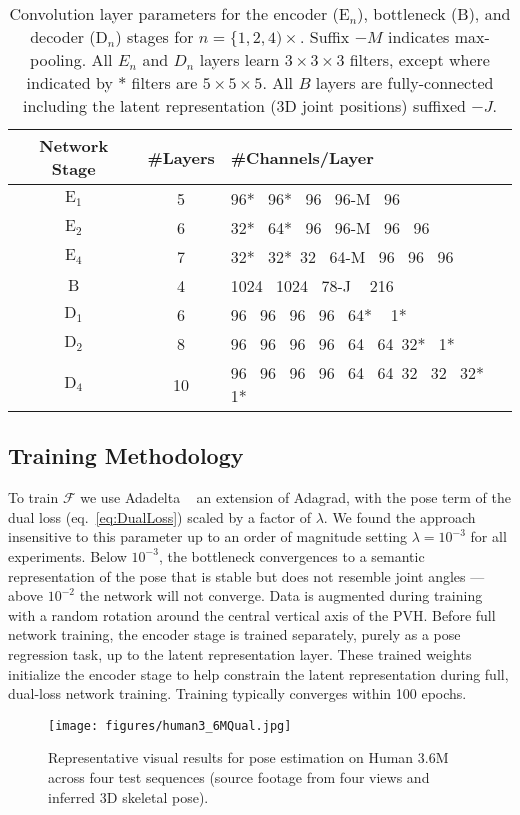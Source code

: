 \documentclass[runningheads]{llncs}
\begin{document}
\begin{table}[t!]
\centering
{
\small
\begin{tabular}{ccl}
\hline
Network Stage   &  \#Layers & \#Channels/Layer \\
\hline
$\mathrm{E}_1$ & 5 & 96*~ 96*~  96~ 96-M~ 96\\
$\mathrm{E}_2$ & 6 & 32*~ 64*~ 96~ 96-M~ 96~ 96\\
$\mathrm{E}_4$ & 7 & 32*~ 32*~32~ 64-M~ 96~ 96~ 96 \\
\hline
$\mathrm{B}$ & 4 & 1024~ 1024~ 78-J ~ 216 \\
\hline
$\mathrm{D}_1$ & 6 & 96~ 96~ 96~ 96~ 64* ~ 1*\\
$\mathrm{D}_2$ & 8 & 96~ 96~ 96~ 96~ 64~ 64~32*~ 1*\\
$\mathrm{D}_4$ & 10 & 96~ 96~ 96~ 96~ 64~ 64~32~ 32~ 32*~ 1*\\
\hline
\end{tabular}
}
\caption{Convolution layer parameters for the encoder ($\mathrm{E}_n$), bottleneck ($\mathrm{B}$), and decoder ($\mathrm{D}_n$) stages for $n=\{1,2,4)\times$.  Suffix $-M$ indicates max-pooling. All $E_n$ and $D_n$ layers learn $3 \times 3 \times 3$ filters, except where indicated by $*$ filters are $5 \times 5 \times 5$. All $B$ layers are fully-connected including the latent representation (3D joint positions) suffixed $-J$.}
\label{tbl:netparams}
\squeezeup
\squeezeup
\end{table}

\subsection {Training Methodology}
\label{sec:train}

To train $\mathcal{F}$ we use Adadelta ~\cite{zeiler2012adadelta} an extension of Adagrad, with the pose term of the dual loss (eq.~\ref{eq:DualLoss}) scaled by a factor of $\lambda$. We found the approach insensitive to this parameter up to an order of magnitude setting $\lambda=10^{-3}$ for all experiments. Below $10^{-3}$, the bottleneck convergences to a semantic representation of the pose that is stable but does not resemble joint angles --- above $10^{-2}$ the network will not converge. Data is augmented during training with a random rotation around the central vertical axis of the PVH. Before full network training, the encoder stage is trained separately, purely as a pose regression task, up to the latent representation layer. These trained weights initialize the encoder stage to help constrain the latent representation during full, dual-loss network training. Training typically converges within 100 epochs.
\begin{figure}[htb]
\centering
\texttt{[image: figures/human3\_6MQual.jpg]}
\caption{Representative visual results for pose estimation on Human 3.6M across four test sequences (source footage from four views and inferred 3D skeletal pose). }
\label{fig:Human36MQual}
\end{figure}
\end{document}
